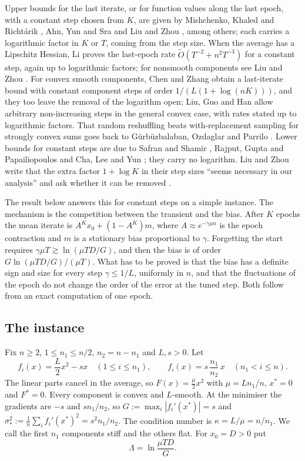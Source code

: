 \documentclass[11pt]{amsart}
\theoremstyle{remark}\newtheorem{remark}[theorem]{Remark}
\begin{document}
Upper bounds for the last iterate, or for function values along the last epoch, with a constant step chosen from $K$,
are given by Mishchenko, Khaled and Richt\'arik \cite{mkr}, Ahn, Yun and Sra \cite{ays} and Liu and Zhou \cite{lz},
among others; each carries a logarithmic factor in $K$ or $T$, coming from the step size. When the average has a
Lipschitz Hessian, Li \cite{li} proves the last-epoch rate $\widetilde O(T^{-2}+n^2T^{-3})$ for a constant step, again
up to logarithmic factors; for nonsmooth components see Liu and Zhou \cite{lz25}. For convex smooth
components, Chen and Zhang \cite{cz} obtain a last-iterate bound with constant component steps of order
$1/(L(1+\log(nK)))$, and they too leave the removal of the logarithm open; Liu, Guo and Han \cite{lgh} allow arbitrary non-increasing steps in the general convex case, with rates stated up to logarithmic factors. That random reshuffling beats with-replacement sampling for strongly convex sums goes back to G\"urb\"uzbalaban, Ozdaglar and Parrilo \cite{gop}. Lower bounds for constant
steps are due to Safran and Shamir \cite{ss,ss21}, Rajput, Gupta and Papailiopoulos \cite{rgp} and Cha, Lee and Yun
\cite{cly}; they carry no logarithm. Liu and Zhou write that the extra factor
$1+\log K$ in their step sizes ``seems necessary in our analysis'' and ask whether it can be removed \cite[Section~6]{lz}.

The result below answers this for constant steps on a simple instance. The mechanism is the competition between the
transient and the bias. After $K$ epochs the mean iterate is $A^K x_0+(1-A^K)m$, where $A\approx e^{-\gamma\mu n}$ is the
epoch contraction and $m$ is a stationary bias proportional to $\gamma$. Forgetting the start requires
$\gamma\mu T\gtrsim\ln(\mu TD/G)$, and then the bias is of order $G\ln(\mu TD/G)/(\mu T)$. What has to be proved is
that the bias has a definite sign and size for every step $\gamma\le 1/L$, uniformly in $n$, and that the fluctuations
of the epoch do not change the order of the error at the tuned step. Both follow from an exact computation of one epoch.

\subsection*{The instance}
Fix $n\ge2$, $1\le n_1\le n/2$, $n_2=n-n_1$ and $L,s>0$. Let
\[
f_i(x)=\frac L2x^2-sx\quad(1\le i\le n_1),\qquad f_i(x)=s\,\frac{n_1}{n_2}\,x\quad(n_1<i\le n).
\]
The linear parts cancel in the average, so $F(x)=\frac{\mu}{2}x^2$ with $\mu=Ln_1/n$, $x^*=0$ and $F^*=0$. Every
component is convex and $L$-smooth. At the minimiser the gradients are $-s$ and $sn_1/n_2$, so
$G:=\max_i|f_i'(x^*)|=s$ and $\sigma_*^2:=\frac1n\sum_i f_i'(x^*)^2=s^2n_1/n_2$. The condition number is $\kappa=L/\mu=n/n_1$.
We call the first $n_1$ components stiff and the others flat. For $x_0=D>0$ put
\[
\Lambda=\ln\frac{\mu TD}{G}.
\]
\end{document}

